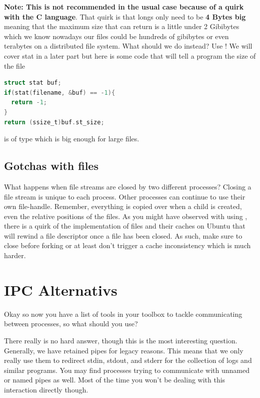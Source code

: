 \textbf{Note: This is not recommended in the usual case because of a quirk with the C language}.
That quirk is that longs only need to be \textbf{4 Bytes big} meaning that the maximum size that  can return is a little under 2 Gibibytes which we know nowadays our files could be hundreds of gibibytes or even terabytes on a distributed file system.
What should we do instead? Use ! We will cover stat in a later part but here is some code that will tell a program the size of the file

\begin{lstlisting}[language=C]
struct stat buf;
if(stat(filename, &buf) == -1){
  return -1;
}
return (ssize_t)buf.st_size;
\end{lstlisting}

 is of type  which is big enough for large files.

\subsection{Gotchas with files}

What happens when file streams are closed by two different processes?
Closing a file stream is unique to each process.
Other processes can continue to use their own file-handle.
Remember, everything is copied over when a child is created, even the relative positions of the files.
As you might have observed with using , there is a quirk of the implementation of files and their caches on Ubuntu that will rewind a file descriptor once a file has been closed.
As such, make sure to close before forking or at least don't trigger a cache inconsistency which is much harder.

\section{IPC Alternativs}

Okay so now you have a list of tools in your toolbox to tackle communicating between processes, so what should you use?

There really is no hard answer, though this is the most interesting question.
Generally, we have retained pipes for legacy reasons.
This means that we only really use them to redirect stdin, stdout, and stderr for the collection of logs and similar programs.
You may find processes trying to communicate with unnamed or named pipes as well.
Most of the time you won't be dealing with this interaction directly though.

